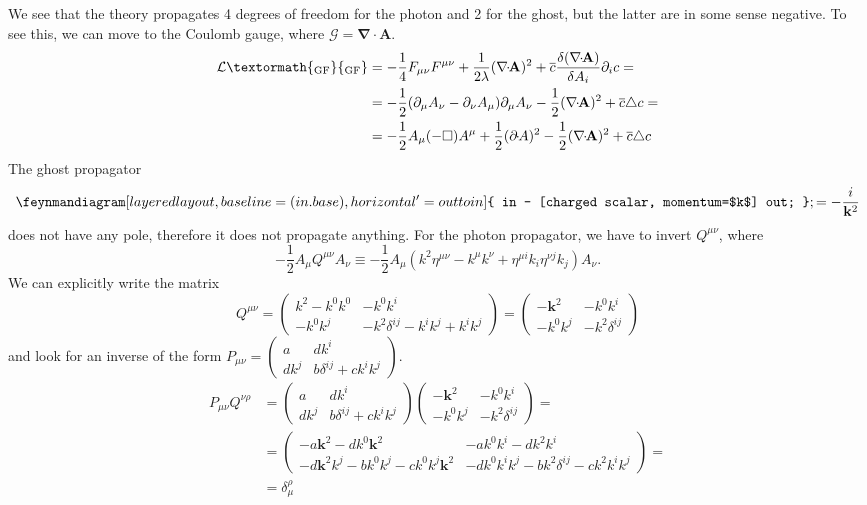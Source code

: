 \documentclass[a4paper,12pt]{book}
\newcommand{\ped}[1]{\textormath{\textsubscript{#1}}{_{\mathrm{#1}}}}
\renewcommand{\vec}{\mathbf}
\theoremstyle{definition}
\theoremstyle{remark}
\let\oldcdot\cdot
\renewcommand{\cdot}{\! \oldcdot \!}
\begin{document}
We see that the theory propagates 4 degrees of freedom for the photon and 2 for the ghost, but the latter are in some sense negative. To see this, we can move to the Coulomb gauge, where $\mathcal G=\vec\nabla\cdot\vec A$.
\begin{align*}
\mathcal L\ped{GF}&=-\frac14F_{\mu\nu}F^{\mu\nu}+\frac1{2\lambda}(\vec\nabla\cdot\vec A)^2+\overline c\frac{\delta (\vec\nabla\cdot\vec A)}{\delta A_i}\partial_i c=\\
&=-\frac12(\partial_\mu A_\nu-\partial_\nu A_\mu)\partial_\mu A_\nu-\frac12(\vec\nabla\cdot\vec A)^2+\overline c\triangle c=\\
&=-\frac12A_\mu(-\Box)A^\mu+\frac12(\partial\cdot A)^2-\frac12(\vec\nabla\cdot\vec A)^2+\overline c\triangle c
\end{align*}
The ghost propagator
\[
\feynmandiagram [layered layout, baseline=(in.base), horizontal'=out to in] {
in -- [charged scalar, momentum=$k$] out;
};
=-\frac{i}{\vec k^2}
\]
does not have any pole, therefore it does not propagate anything. For the photon propagator, we have to invert $Q^{\mu\nu}$, where
\[-\frac12A_\mu Q^{\mu\nu}A_\nu\equiv-\frac12A_\mu(k^2\eta^{\mu\nu}-k^\mu k^\nu+\eta^{\mu i}k_i\eta^{\nu j}k_j)A_\nu.\]
We can explicitly write the matrix
\[
Q^{\mu\nu}=
\begin{pmatrix}
k^2-k^0k^0 & -k^0k^i\\
-k^0k^j & -k^2\delta^{ij}-k^ik^j+k^ik^j
\end{pmatrix}=
\begin{pmatrix}
-\vec k^2 & -k^0k^i\\
-k^0k^j & -k^2\delta^{ij}
\end{pmatrix}
\]
and look for an inverse of the form $P_{\mu\nu}=
\begin{pmatrix}
a & dk^i\\
dk^j & b\delta^{ij}+ck^ik^j
\end{pmatrix}$.
\begin{align*}
P_{\mu\nu}Q^{\nu\rho}&=\begin{pmatrix}
a & dk^i\\
dk^j & b\delta^{ij}+ck^ik^j
\end{pmatrix}
\begin{pmatrix}
-\vec k^2 & -k^0k^i\\
-k^0k^j & -k^2\delta^{ij}
\end{pmatrix}=\\
&=
\begin{pmatrix}
-a\vec k^2-dk^0\vec k^2 & -ak^0k^i-dk^2k^i\\
-d\vec k^2k^j-bk^0k^j-ck^0k^j\vec k^2 & -dk^0k^ik^j-bk^2\delta^{ij}-ck^2k^ik^j
\end{pmatrix}=\\
&=\delta^\rho_\mu
\end{align*}
\end{document}
